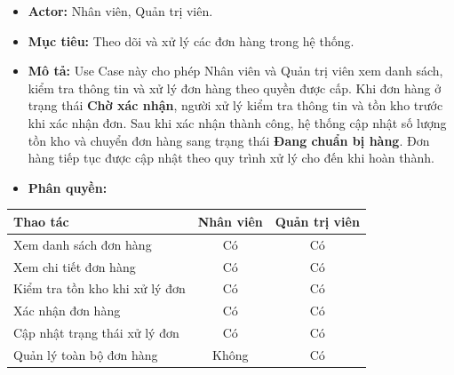 \documentclass[12pt,a4paper]{article}
\begin{document}
\begin{itemize}
    \item \textbf{Actor:} Nhân viên, Quản trị viên.
    \item \textbf{Mục tiêu:} Theo dõi và xử lý các đơn hàng trong hệ thống.
    \item \textbf{Mô tả:} Use Case này cho phép Nhân viên và Quản trị viên xem danh sách, kiểm tra thông tin và xử lý đơn hàng theo quyền được cấp. Khi đơn hàng ở trạng thái \textbf{Chờ xác nhận}, người xử lý kiểm tra thông tin và tồn kho trước khi xác nhận đơn. Sau khi xác nhận thành công, hệ thống cập nhật số lượng tồn kho và chuyển đơn hàng sang trạng thái \textbf{Đang chuẩn bị hàng}. Đơn hàng tiếp tục được cập nhật theo quy trình xử lý cho đến khi hoàn thành.
    \item \textbf{Phân quyền:}
\end{itemize}

\begin{center}
\begin{tabular}{|p{7cm}|c|c|}
\hline
\textbf{Thao tác} & \textbf{Nhân viên} & \textbf{Quản trị viên} \\
\hline
Xem danh sách đơn hàng & Có & Có \\
\hline
Xem chi tiết đơn hàng & Có & Có \\
\hline
Kiểm tra tồn kho khi xử lý đơn & Có & Có \\
\hline
Xác nhận đơn hàng & Có & Có \\
\hline
Cập nhật trạng thái xử lý đơn & Có & Có \\
\hline
Quản lý toàn bộ đơn hàng & Không & Có \\
\hline
\end{tabular}
\end{center}
\end{document}
